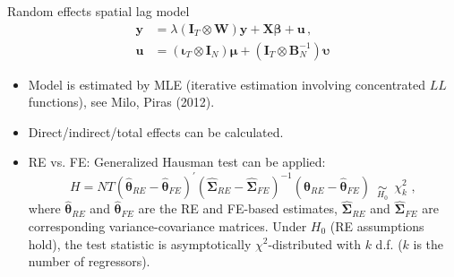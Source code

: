\documentclass{beamer}
\newcommand{\Ms}[2]{\bm{#1}_{#2}}
\begin{document}
\begin{frame}{Random effects spatial lag model}
    \begin{equation*} 
     \begin{aligned}
      \bm{y}  &= 
      \lambda \left( \Ms{I}{T} \otimes \bm{W} \right) \bm{y} + \bm{X\beta} + \bm{u}\,, \\
      \bm{u} &= 
      \left( \Ms{\iota}{T} \otimes \Ms{I}{N} \right) \bm{\mu} + 
      \left( \Ms{I}{T} \otimes \Ms{B}{N}^{-1} \right) \bm{\upsilon}
     \end{aligned}
    \end{equation*}
\begin{itemize}
    \item Model is estimated by MLE (iterative estimation involving concentrated $LL$ functions), see Milo, Piras (2012).
    \medskip
    \item Direct/indirect/total effects can be calculated.
    \medskip
    \item RE vs. FE: Generalized Hausman test can be applied: 
    \begin{equation*} 
    H = NT \left( \bm{\hat{\theta}}_{RE} - \bm{\hat{\theta}}_{FE} \right)^{\prime}
    \! \left( \bm{\hat{\Sigma}}_{RE} - \bm{\hat{\Sigma}}_{FE} \right)^{-1}
    \! \left( \bm{\hat{\theta}}_{RE} - \bm{\hat{\theta}}_{FE} \right)
    \,\,\, \underset{H_0}{\sim} \,\,\, \chi_k^2 \,\,,
\end{equation*}
where $\bm{\hat{\theta}}_{RE}$ and $\bm{\hat{\theta}}_{FE}$ are the RE and FE-based estimates, $\bm{\hat{\Sigma}}_{RE}$ and $\bm{\hat{\Sigma}}_{FE}$ are corresponding variance-covariance matrices. Under $H_0$ (RE assumptions hold), the test statistic is asymptotically $\chi^2$-distributed with $k$ d.f. ($k$ is the number of regressors).
\end{itemize}
\end{frame}
\end{document}
